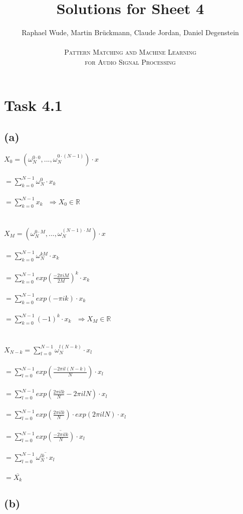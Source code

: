 \documentclass[12pt]{article}
\begin{document}
\title{Solutions for Sheet 4}
\author{Raphael Wude, Martin Brückmann, Claude Jordan, Daniel Degenstein\\ \\
\textsc{Pattern Matching and Machine Learning} \\
\textsc{for Audio Signal Processing}}
\maketitle

\section*{Task 4.1}
\subsection*{(a)}
$X_{0}=(\omega^{0\cdot0}_{N},...,\omega^{0\cdot(N-1)}_{N})\cdot x$\\\\
$=\sum^{N-1}_{k=0} \omega^{0}_{N}\cdot x_{k}$\\\\
$=\sum^{N-1}_{k=0} x_{k} ~~~\Rightarrow X_{0} \in \mathbb{R}$\\\\\\
$X_{M}=(\omega^{0\cdot M}_{N},...,\omega^{(N-1)\cdot M}_{N})\cdot x$\\\\
$=\sum^{N-1}_{k=0} \omega^{kM}_{N}\cdot x_{k}$\\\\
$=\sum^{N-1}_{k=0} exp(\frac{-2\pi iM}{2M})^{k}\cdot x_{k}$\\\\
$=\sum^{N-1}_{k=0} exp(-\pi ik)\cdot x_{k}$\\\\
$=\sum^{N-1}_{k=0} (-1)^{k}\cdot x_{k} ~~~\Rightarrow X_{M} \in \mathbb{R}$\\\\\\
$X_{N-k}=\sum^{N-1}_{l=0} \omega^{l(N-k)}_{N}\cdot x_{l}$\\\\
$=\sum^{N-1}_{l=0} exp(\frac{-2\pi il(N-k)}{N})\cdot x_{l}$\\\\
$=\sum^{N-1}_{l=0} exp(\frac{2\pi ilk}{N}-2\pi ilN)\cdot x_{l}$\\\\
$=\sum^{N-1}_{l=0} exp(\frac{2\pi ilk}{N})\cdot exp(2\pi ilN)\cdot x_{l}$\\\\
$=\sum^{N-1}_{l=0} \overline{exp(\frac{-2\pi ilk}{N})\cdot x_{l}}$\\\\
$=\sum^{N-1}_{l=0} \overline{\omega^{lk}_{N}\cdot x_{l}}$\\\\
$=\overline{X_{k}}$

\subsection*{(b)}
\end{document}
